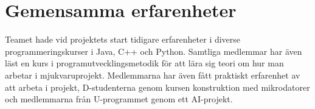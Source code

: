\section{Gemensamma erfarenheter}
Teamet hade vid projektets start tidigare erfarenheter i diverse programmeringskurser i Java, C++ och Python.
Samtliga medlemmar har även läst en kurs i programutvecklingsmetodik för att lära sig teori om hur man arbetar i mjukvaruprojekt.
Medlemmarna har även fått praktiskt erfarenhet av att arbeta i projekt, D-studenterna genom kursen konstruktion med mikrodatorer och medlemmarna från U-programmet genom ett AI-projekt.
